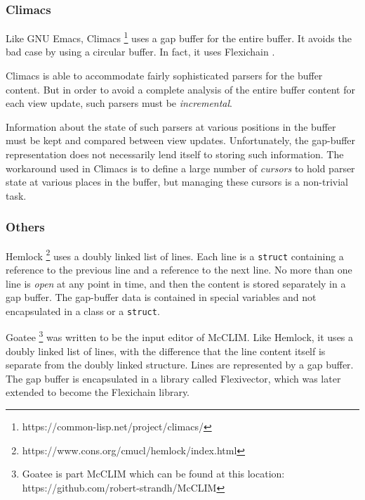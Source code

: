 \subsubsection{Climacs}

Like GNU Emacs, Climacs%
\footnote{https://common-lisp.net/project/climacs/}
uses a gap buffer for the entire buffer.  It
avoids the bad case by using a circular buffer.  In fact, it uses
Flexichain \cite{flexichain}.

Climacs is able to accommodate fairly sophisticated parsers for the
buffer content.  But in order to avoid a complete analysis of the
entire buffer content for each view update, such parsers must be
\emph{incremental}.

Information about the state of such parsers at various positions in
the buffer must be kept and compared between view updates.
Unfortunately, the gap-buffer representation does not necessarily lend
itself to storing such information.  The workaround used in Climacs is
to define a large number of \emph{cursors} to hold parser state at
various places in the buffer, but managing these cursors is a
non-trivial task.

\subsubsection{Others}

Hemlock%
\footnote{https://www.cons.org/cmucl/hemlock/index.html}
uses a doubly linked list of lines.  Each line is a \texttt{struct}
containing a reference to the previous line and a reference to the
next line.  No more than one line is \emph{open} at any point in time,
and then the content is stored separately in a gap buffer.  The
gap-buffer data is contained in special variables and not encapsulated
in a class or a \texttt{struct}.

Goatee%
\footnote{Goatee is part McCLIM which can be found at this location:
https://github.com/robert-strandh/McCLIM}
was written to be the input editor of McCLIM.  Like Hemlock, it
uses a doubly linked list of lines, with the difference that the line
content itself is separate from the doubly linked structure.  Lines
are represented by a gap buffer.  The gap buffer is encapsulated in
a library called Flexivector, which was later extended to become the
Flexichain library.
